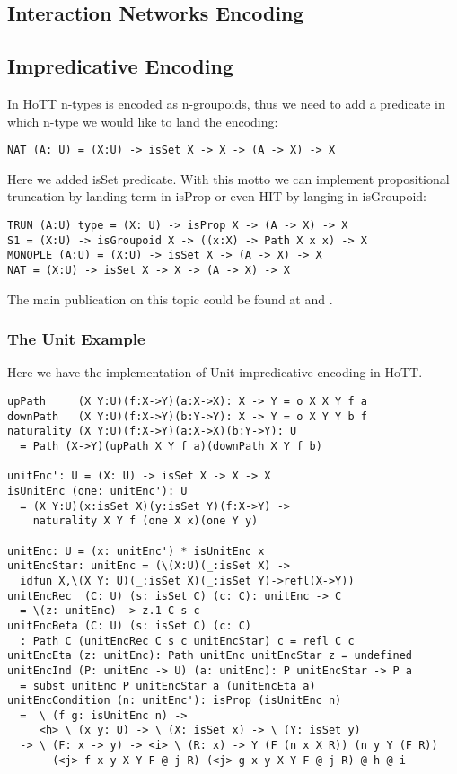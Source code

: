 \documentclass{article}
\theoremstyle{definition}
\begin{document}
\subsection{Interaction Networks Encoding}

\subsection{Impredicative Encoding}

In HoTT n-types is encoded as n-groupoids, thus we need to add a predicate in which n-type
we would like to land the encoding:

\begin{lstlisting}[mathescape=true]
NAT (A: U) = (X:U) -> isSet X -> X -> (A -> X) -> X
\end{lstlisting}

Here we added isSet predicate. With this motto we can implement propositional
truncation by landing term in isProp or even HIT by langing in isGroupoid:

\begin{lstlisting}[mathescape=true]
TRUN (A:U) type = (X: U) -> isProp X -> (A -> X) -> X
S1 = (X:U) -> isGroupoid X -> ((x:X) -> Path X x x) -> X
MONOPLE (A:U) = (X:U) -> isSet X -> (A -> X) -> X
NAT = (X:U) -> isSet X -> X -> (A -> X) -> X
\end{lstlisting}

The main publication on this topic could be found at \cite{Awodey17} and \cite{Speight17}.

\subsubsection*{The Unit Example}

Here we have the implementation of Unit impredicative encoding in HoTT.

\begin{lstlisting}[mathescape=true]
upPath     (X Y:U)(f:X->Y)(a:X->X): X -> Y = o X X Y f a
downPath   (X Y:U)(f:X->Y)(b:Y->Y): X -> Y = o X Y Y b f
naturality (X Y:U)(f:X->Y)(a:X->X)(b:Y->Y): U
  = Path (X->Y)(upPath X Y f a)(downPath X Y f b)

unitEnc': U = (X: U) -> isSet X -> X -> X
isUnitEnc (one: unitEnc'): U
  = (X Y:U)(x:isSet X)(y:isSet Y)(f:X->Y) ->
    naturality X Y f (one X x)(one Y y)

unitEnc: U = (x: unitEnc') * isUnitEnc x
unitEncStar: unitEnc = (\(X:U)(_:isSet X) ->
  idfun X,\(X Y: U)(_:isSet X)(_:isSet Y)->refl(X->Y))
unitEncRec  (C: U) (s: isSet C) (c: C): unitEnc -> C
  = \(z: unitEnc) -> z.1 C s c
unitEncBeta (C: U) (s: isSet C) (c: C)
  : Path C (unitEncRec C s c unitEncStar) c = refl C c
unitEncEta (z: unitEnc): Path unitEnc unitEncStar z = undefined
unitEncInd (P: unitEnc -> U) (a: unitEnc): P unitEncStar -> P a
  = subst unitEnc P unitEncStar a (unitEncEta a)
unitEncCondition (n: unitEnc'): isProp (isUnitEnc n)
  =  \ (f g: isUnitEnc n) ->
     <h> \ (x y: U) -> \ (X: isSet x) -> \ (Y: isSet y)
  -> \ (F: x -> y) -> <i> \ (R: x) -> Y (F (n x X R)) (n y Y (F R))
       (<j> f x y X Y F @ j R) (<j> g x y X Y F @ j R) @ h @ i
\end{lstlisting}
\end{document}
